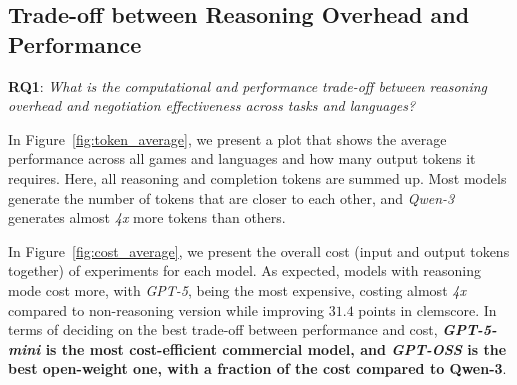 \documentclass[11pt]{article}
\begin{document}
\subsection{Trade-off between Reasoning Overhead and Performance}


\textbf{RQ1}: \textit{What is the computational and performance trade-off between reasoning overhead and negotiation effectiveness across tasks and languages?}

In Figure~\ref{fig:token_average}, we present a plot that shows the average performance across all games and languages and how many output tokens it requires. Here, all reasoning and completion tokens are summed up. Most models generate the number of tokens that are closer to each other, and \textit{Qwen-3} generates almost \textit{4x} more tokens than others.

In Figure~\ref{fig:cost_average}, we present the overall cost (input and output tokens together) of experiments for each model. As expected, models with reasoning mode cost more, with \textit{GPT-5}, being the most expensive, costing almost \textit{4x} compared to non-reasoning version while improving $31.4$ points in clemscore. In terms of deciding on the best trade-off between performance and cost, \textbf{\textit{GPT-5-mini} is the most cost-efficient commercial model, and \textit{GPT-OSS} is the best open-weight one, with a fraction of the cost compared to Qwen-3}.







\end{document}

